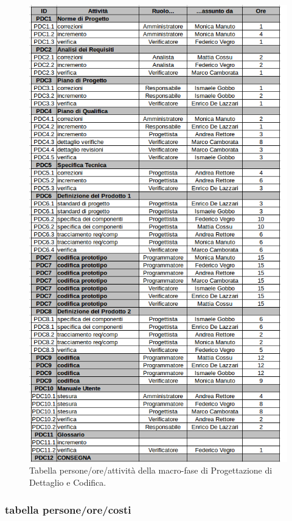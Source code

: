 \begin{figure}[h]
\begin{center}
\includegraphics[scale=0.45]{img/progdet-attivita.png}
\caption{Tabella persone/ore/attività della macro-fase di Progettazione di Dettaglio e Codifica.}
\end{center}
\end{figure}
\clearpage

\subsubsection{tabella persone/ore/costi}

